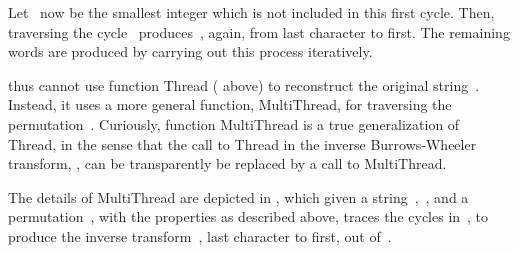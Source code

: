 \documentclass[a4paper,12pt]{article}
\newcommand{\Abs}[1]{\ensuremath{\left|#1\right|}}
\newcommand{\alg}[1]{{\textup{\textsf{#1}}}}
\numberwithin{algorithm}{section}
\begin{document}
Let~ now be the smallest integer which is not included in this first cycle.
Then, traversing the cycle~
  produces~, again, from last character to first.
The remaining words are produced by carrying out this process iteratively.

 thus cannot use
  function \alg{Thread} ( above)
  to reconstruct the original string~.
Instead, it uses a more general function,
  \alg{MultiThread},
  for traversing the permutation~.
Curiously,  function \alg{MultiThread} is  a true generalization of \alg{Thread},
  in the sense that the call to \alg{Thread} in the inverse Burrows-Wheeler transform,
 , can be transparently be replaced by a call to \alg{MultiThread}.

The details of \alg{MultiThread} are depicted in , which given
  a string~,~, and a permutation~,
  with the properties as described above, traces the cycles in~, to produce the
  inverse transform~, last character to first, out of~.

\begin{algorithm}[!htb]
\caption{
  }
\label{Algorithm:MultiThread}
\begin{algorithmic}[1]
\LET{n}{\Abs{η}}
\label{line:multi:begin:mundane}
  \STATE{} 
\ENDFOR
\label{line:multi:end:mundane}

\STATE{}
\label{Line:outer:begin}
    \STATE{}  
\label{Line:inner:begin}
    \STATE{} 
    \STATE{} 
    \STATE{} 
    \STATE{} 
    \STATE{} 
    \UNTIL{} 
\label{Line:inner:end}
  \ENDIF
\ENDFOR
\label{Line:outer:end}
\RETURN
\end{algorithmic}

\end{algorithm}
\end{document}
